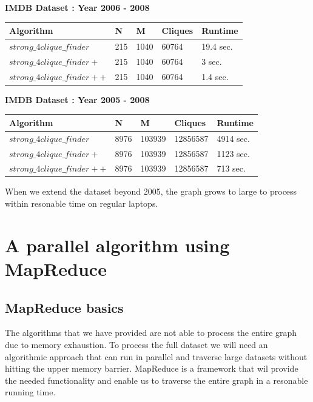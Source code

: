 \documentclass{article}
\begin{document}
\textbf{IMDB Dataset : Year 2006 - 2008}
\label{result1}
\begin{center}
    \begin{tabular}{ | l | l | l | l | l |}
    \hline
    Algorithm & N & M & Cliques & Runtime \\ \hline
    $strong\_4clique\_finder$ & 215 & 1040 & 60764 & 19.4 sec. \\ \hline
    $strong\_4clique\_finder+$ & 215 & 1040 & 60764 & 3 sec. \\ \hline
    $strong\_4clique\_finder++$ & 215 & 1040 & 60764 & 1.4 sec. \\ \hline
    \end{tabular}
\end{center}

\textbf{IMDB Dataset : Year 2005 - 2008}
\begin{center}
    \begin{tabular}{ | l | l | l | l | l |}
    \hline
    Algorithm & N & M & Cliques & Runtime \\ \hline
    $strong\_4clique\_finder$ & 8976 & 103939 & 12856587 & 4914 sec. \\ \hline
    $strong\_4clique\_finder+$ & 8976 & 103939 & 12856587 & 1123 sec.\\ \hline
    $strong\_4clique\_finder++$ & 8976 & 103939 & 12856587 & 713 sec. \\ \hline
    \end{tabular}
\end{center}

When we extend the dataset beyond 2005, the graph grows to large to process within resonable time on regular laptops.

\section{A parallel algorithm using MapReduce}

\subsection{MapReduce basics}
The algorithms that we have provided are not able to process the entire graph due to memory exhaustion. To process the full dataset we will need an algorithmic approach that can run in parallel and traverse large datasets without hitting the upper memory barrier. MapReduce is a framework that wil provide the needed functionality and enable us to traverse the entire graph in a resonable running time.
\end{document}
